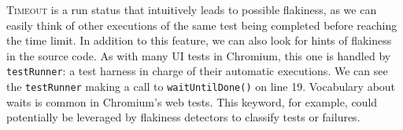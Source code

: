 \textsc{Timeout} is a run status that intuitively leads to possible flakiness, as we can easily think of other executions of the same test being completed before reaching the time limit. In addition to this feature, we can also look for hints of flakiness in the source code. As with many UI tests in Chromium, this one is handled by \texttt{testRunner}: a test harness in charge of their automatic executions. We can see the \texttt{testRunner} making a call to \texttt{waitUntilDone()} on line 19. Vocabulary about waits is common in Chromium's web tests. This keyword, for example, could potentially be leveraged by flakiness detectors to classify tests or failures.


